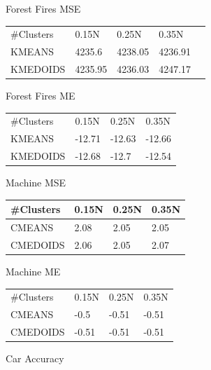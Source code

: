 \documentclass[twoside,11pt]{article}
\begin{document}
\begin{table}[h]
	\begin{minipage}[b]{0.45\linewidth}\centering
			Forest Fires MSE
			\begin{tabular}{lllll}
				\cline{1-4}
				\#Clusters & 0.15N   & 0.25N   & 0.35N   &  \\ \cline{1-4}
				KMEANS     & 4235.6  & 4238.05 & 4236.91 &  \\
				KMEDOIDS   & 4235.95 & 4236.03 & 4247.17 &  \\
			\end{tabular}
	\end{minipage}
	\hspace{0.5cm}
	\begin{minipage}[b]{0.45\linewidth}
		Forest Fires ME
		\centering
		\begin{tabular}{llll}
			\cline{1-4}
			\#Clusters & 0.15N  & 0.25N  & 0.35N  \\ \cline{1-4}
			KMEANS     & -12.71 & -12.63 & -12.66 \\
			KMEDOIDS   & -12.68 & -12.7  & -12.54
		\end{tabular}
	\end{minipage}
	\begin{minipage}[b]{0.45\linewidth}\centering
		Machine MSE
		\begin{tabular}{llll}
			\hline
			\#Clusters & 0.15N & 0.25N & 0.35N \\ \hline
			CMEANS     & 2.08  & 2.05  & 2.05  \\
			CMEDOIDS   & 2.06  & 2.05  & 2.07
		\end{tabular}
	\end{minipage}
	\hspace{0.5cm}
	\begin{minipage}[b]{0.45\linewidth}
		Machine ME
		\centering
		\begin{tabular}{llll}
			 \cline{1-4}
			\#Clusters & 0.15N & 0.25N & 0.35N \\  \cline{1-4}
			CMEANS     & -0.5  & -0.51 & -0.51 \\
			CMEDOIDS   & -0.51 & -0.51 & -0.51
		\end{tabular}
	\end{minipage}
	\begin{minipage}[b]{0.45\linewidth}\centering
		Car Accuracy
		\begin{tabular}{llll}

\end{tabular}
\end{minipage}
\end{table}
\end{document}
